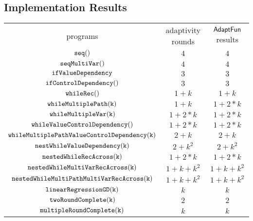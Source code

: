 \subsection{Implementation Results}  
    \begin{center}
        \begin{tabular}{ c c c }
         programs & adaptivity rounds & $\textsf{AdaptFun}$ results \\ 
         $\mathtt{seq()}$ & $4$ & $4$ \\ 
         $\mathtt{seqMultiVar()}$ & $4$ & $4$ \\  
         $ \mathtt{ifValueDependency}$ & $3$ & $3$  \\
         $\mathtt{ifControlDependency()}$ & $3$ & $3$  \\
         $ \mathtt{whileRec()}$ & $1+k$ & $1+k$  \\
         $ \mathtt{whileMultiplePath(k)}$ & $1 + k$ & $1 + 2 * k$  \\
         $ \mathtt{whileMultipleVar(k)}$ & $1 + 2*k$ & $1 + 2*k$  \\
         $ \mathtt{whileValueControlDependency()}$ & $1 + 2*k$ & $1 + 2*k$  \\
         $ \mathtt{whileMultiplePathValueControlDependency(k)}$ & $2 + k$ & $2 + k$  \\
         $ \mathtt{nestWhileValueDependency(k)}$ & $2 + k^2$ & $2 + k^2$  \\
         $ \mathtt{nestedWhileRecAcross(k)}$ & $1 + 2*k$ & $1 + 2*k$  \\
         $ \mathtt{nestedWhileMultiVarRecAcross(k)}$ & $1 + k + k^2$ & $1 + k + k^2$  \\
         $ \mathtt{nestedWhileMultiPathMultiVarRecAcross(k)}$ & $1 + k + k^2$ & $1 + k + k^2$  \\
         $ \mathtt{linearRegressionGD(k)}$ & $k$ & $k$  \\
         $ \mathtt{twoRoundComplete(k)}$ & $2$ & $2$  \\
         $ \mathtt{multipleRoundComplete(k)}$ & $k$ & $k$  \\
        \end{tabular}
        \end{center}
